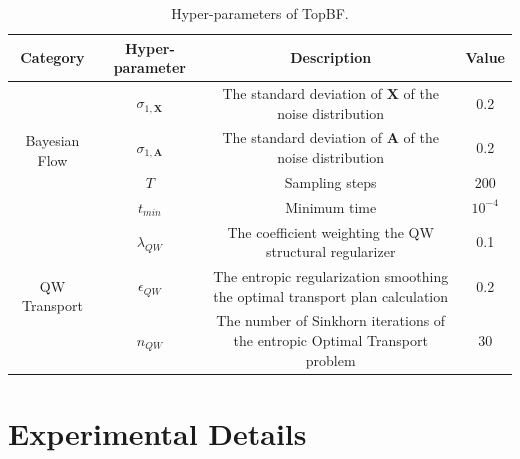 \documentclass[journal,twoside,web]{ieeecolor}
\begin{document}


\begin{table}[t]
  \centering
  \caption{Hyper-parameters of TopBF.}
  \renewcommand \arraystretch{1.0}
  \begin{tabular*}{\textwidth}{@{\extracolsep{\fill}}cccc@{\extracolsep{\fill}}}
    \toprule
    Category & Hyper-parameter & Description & Value \\
    \midrule
    
    \multirow{4}{*}{Bayesian Flow} & $\sigma_{1, \mathbf{X}}$ & The standard deviation of $\mathbf{X}$ of the noise distribution & 0.2 \\
    & $\sigma_{1, \mathbf{A}}$ & The standard deviation of $\mathbf{A}$ of the noise distribution & 0.2 \\
    & $T$ & Sampling steps & 200 \\
    & $t_{min}$ & Minimum time & $10^{-4}$ \\

    \midrule
    \multirow{3}{*}{QW Transport} & $\lambda_{QW}$ & The coefficient weighting the QW structural regularizer & 0.1 \\
    & $\epsilon_{QW}$ & The entropic regularization smoothing the optimal transport plan calculation & 0.2 \\
    & $n_{QW}$ & The number of Sinkhorn iterations of the entropic Optimal Transport problem & 30 \\
    
    \hline
  \end{tabular*}
  \label{tab:hp}
\end{table}

\section{Experimental Details}

\end{document}

